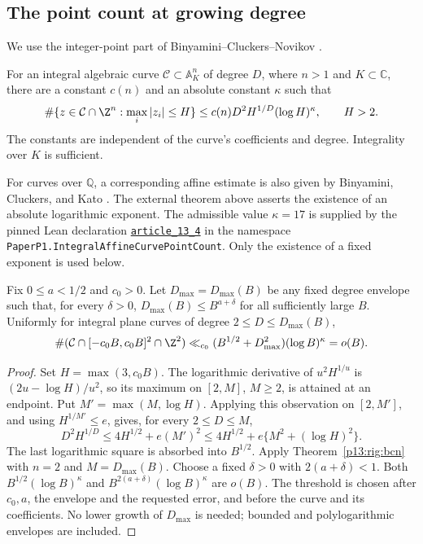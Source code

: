 \subsection{The point count at growing degree}

We use the integer-point part of Binyamini--Cluckers--Novikov
\cite[Theorem~2, equation~(27), in the specified author
version]{binyaminicluckersnovikov2024}.

\begin{theorem}
\label{p13:rig:bcn}
For an integral algebraic curve $\mathcal C\subset\mathbb A^n_K$
of degree $D$, where $n>1$ and $K\subset\mathbb C$, there are
a constant $c(n)$ and an absolute constant $\kappa$ such that
\[
 \#\{z\in\mathcal C\cap\Z^n:\max_i|z_i|\le H\}
       \le c(n)D^2H^{1/D}(\log H)^\kappa,
       \qquad H>2.
\]
The constants are independent of the curve's coefficients
and degree.  Integrality over $K$ is sufficient.
\end{theorem}

For curves over $\mathbb Q$, a corresponding affine estimate is also
given by Binyamini, Cluckers, and Kato
\cite[Corollary~8, equation~(23)]{binyaminicluckerskato2025}.
The external theorem above asserts the existence of an absolute
logarithmic exponent. The admissible value $\kappa=17$ is supplied by
the pinned Lean declaration
\href{https://github.com/Vulkin-prog/paper-p1-lean/blob/a1c8092f7e25acf7f3b78283039cfbd69491f88e/PaperP1/Arithmetic/IntegralAffineCurvePointCount.lean}
{\texttt{article\_13\_4}}
in the namespace \texttt{PaperP1.IntegralAffineCurvePointCount}.
Only the existence of a fixed exponent is used below.

\begin{corollary}
\label{p13:rig:sublinear-grid}
Fix $0\le a<1/2$ and $c_0>0$. Let $D_{\max}=D_{\max}(B)$
be any fixed degree envelope such that, for every $\delta>0$,
$D_{\max}(B)\le B^{a+\delta}$ for all sufficiently large $B$.
Uniformly for integral plane curves of degree $2\le D\le D_{\max}(B)$,
\[
 \#(\mathcal C\cap[-c_0B,c_0B]^2\cap\Z^2)
 \ll_{c_0}(B^{1/2}+D_{\max}^2)(\log B)^\kappa=o(B).
\]
\end{corollary}

\begin{proof}
Set $H=\max(3,c_0B)$.  The logarithmic derivative of
$u^2H^{1/u}$ is $(2u-\log H)/u^2$, so its maximum on
$[2,M]$, $M\ge2$, is attained at an endpoint.
Put $M'=\max(M,\log H)$. Applying this observation on $[2,M']$,
and using $H^{1/M'}\le e$, gives, for every $2\le D\le M$,
\[
 D^2H^{1/D}
 \le 4H^{1/2}+e(M')^2
 \le4H^{1/2}+e\{M^2+(\log H)^2\}.
\]
The last logarithmic square is absorbed into $B^{1/2}$.
Apply Theorem~\ref{p13:rig:bcn} with $n=2$ and $M=D_{\max}(B)$.
Choose a fixed $\delta>0$ with $2(a+\delta)<1$. Both
$B^{1/2}(\log B)^\kappa$ and
$B^{2(a+\delta)}(\log B)^\kappa$ are $o(B)$.
The threshold is chosen after $c_0,a$, the envelope and the requested
error, and before the curve and its coefficients. No lower growth of
$D_{\max}$ is needed; bounded and polylogarithmic envelopes are included.
\end{proof}

